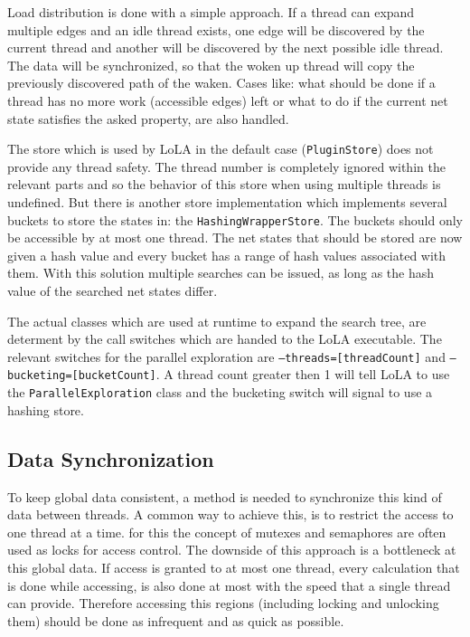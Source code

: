 Load distribution is done with a simple approach. If a thread can expand multiple edges and an idle thread exists, one edge will be discovered by the current thread and another will be discovered by the next possible idle thread. The data will be synchronized, so that the woken up thread will copy the previously discovered path of the waken. Cases like: what should be done if a thread has no more work (accessible edges) left or what to do if the current net state satisfies the asked property, are also handled.

The store which is used by LoLA in the default case (\texttt{PluginStore}) does not provide any thread safety. The thread number is completely ignored within the relevant parts and so the behavior of this store when using multiple threads is undefined. But there is another store implementation which implements several buckets to store the states in: the \texttt{HashingWrapperStore}. The buckets should only be accessible by at most one thread. The net states that should be stored are now given a hash value and every bucket has a range of hash values associated with them. With this solution multiple searches can be issued, as long as the hash value of the searched net states differ.

The actual classes which are used at runtime to expand the search tree, are determent by the call switches which are handed to the LoLA executable. The relevant switches for the parallel exploration are \texttt{--threads=[threadCount]} and \texttt{--bucketing=[bucketCount]}. A thread count greater then 1 will tell LoLA to use the \texttt{ParallelExploration} class and the bucketing switch will signal to use a hashing store.

\subsection{Data Synchronization}
To keep global data consistent, a method is needed to synchronize this kind of data between threads. A common way to achieve this, is to restrict the access to one thread at a time. for this the concept of mutexes and semaphores are often used as locks for access control. The downside of this approach is a bottleneck at this global data. If access is granted to at most one thread, every calculation that is done while accessing, is also done at most with the speed that a single thread can provide. Therefore accessing this regions (including locking and unlocking them) should be done as infrequent and as quick as possible.

